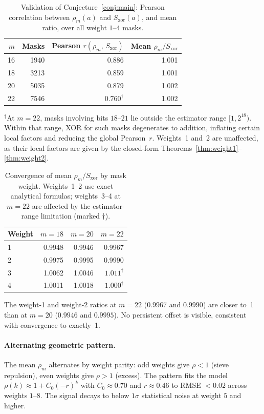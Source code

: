 \documentclass[12pt]{article}
\begin{document}
\begin{table}[h]
\centering
\caption{Validation of Conjecture~\ref{conj:main}: Pearson correlation
between $\rho_m(a)$ and $S_{\mathrm{xor}}(a)$, and mean ratio, over all
weight $1$--$4$ masks.}
\label{tab:globalvalid}
\begin{tabular}{rrrr}
\toprule
$m$ & Masks & Pearson $r(\rho_m,\,S_{\mathrm{xor}})$ & Mean $\rho_m/S_{\mathrm{xor}}$ \\
\midrule
16 & 1940 & 0.886 & 1.001 \\
18 & 3213 & 0.859 & 1.001 \\
20 & 5035 & 0.879 & 1.002 \\
22 & 7546 & $0.760^\dagger$ & 1.002 \\
\bottomrule
\end{tabular}
\end{table}

${}^\dagger$At $m=22$, masks involving bits $18$--$21$ lie outside
the estimator range $[1,2^{18})$.
Within that range, XOR for such masks degenerates to addition, inflating
certain local factors and reducing the global Pearson~$r$.
Weights~1 and~2 are unaffected, as their local factors are given by the
closed-form Theorems~\ref{thm:weight1}--\ref{thm:weight2}.

\begin{table}[h]
\centering
\caption{Convergence of mean $\rho_m/S_{\mathrm{xor}}$ by mask weight.
Weights~1--2 use exact analytical formulas; weights~3--4 at $m=22$
are affected by the estimator-range limitation (marked $\dagger$).}
\label{tab:byweight}
\begin{tabular}{lrrr}
\toprule
Weight & $m=18$ & $m=20$ & $m=22$ \\
\midrule
1 & 0.9948 & 0.9946 & 0.9967 \\
2 & 0.9975 & 0.9995 & 0.9990 \\
3 & 1.0062 & 1.0046 & $1.011^\dagger$ \\
4 & 1.0011 & 1.0018 & $1.000^\dagger$ \\
\bottomrule
\end{tabular}
\end{table}

The weight-1 and weight-2 ratios at $m=22$ ($0.9967$ and $0.9990$)
are closer to~1 than at $m=20$ ($0.9946$ and $0.9995$).
No persistent offset is visible, consistent with convergence to exactly~1.

\paragraph{Alternating geometric pattern.}
The mean $\rho_m$ alternates by weight parity: odd weights give
$\rho < 1$ (sieve repulsion), even weights give $\rho > 1$ (excess).
The pattern fits the model $\rho(k) \approx 1 + C_0(-r)^k$ with
$C_0 \approx 0.70$ and $r \approx 0.46$ to RMSE $< 0.02$ across weights $1$--$8$.
The signal decays to below $1\sigma$ statistical noise at weight $5$ and higher.
\end{document}
